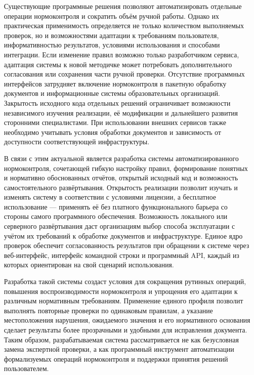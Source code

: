 \documentclass[a4paper,14pt]{extarticle}
\begin{document}
Существующие программные решения позволяют автоматизировать отдельные операции нормоконтроля и сократить объём ручной работы. Однако их практическая применимость определяется не только количеством выполняемых проверок, но и возможностями адаптации к требованиям пользователя, информативностью результатов, условиями использования и способами интеграции. Если изменение правил возможно только разработчиком сервиса, адаптация системы к новой методичке может потребовать дополнительного согласования или сохранения части ручной проверки. Отсутствие программных интерфейсов затрудняет включение нормоконтроля в пакетную обработку документов и информационные системы образовательных организаций. Закрытость исходного кода отдельных решений ограничивает возможности независимого изучения реализации, её модификации и дальнейшего развития сторонними специалистами. При использовании внешних сервисов также необходимо учитывать условия обработки документов и зависимость от доступности соответствующей инфраструктуры.

В связи с этим актуальной является разработка системы автоматизированного нормоконтроля, сочетающей гибкую настройку правил, формирование понятных и нормативно обоснованных отчётов, открытый исходный код и возможность самостоятельного развёртывания. Открытость реализации позволит изучать и изменять систему в соответствии с условиями лицензии, а бесплатное использование — применять её без платного функционального барьера со стороны самого программного обеспечения. Возможность локального или серверного развёртывания даст организациям выбор способа эксплуатации с учётом их требований к обработке документов и инфраструктуре. Единое ядро проверок обеспечит согласованность результатов при обращении к системе через веб-интерфейс, интерфейс командной строки и программный API, каждый из которых ориентирован на свой сценарий использования.

Разработка такой системы создаст условия для сокращения рутинных операций, повышения воспроизводимости нормоконтроля и упрощения его адаптации к различным нормативным требованиям. Применение единого профиля позволит выполнять повторные проверки по одинаковым правилам, а указание местоположения нарушения, ожидаемого значения и его нормативного основания сделает результаты более прозрачными и удобными для исправления документа. Таким образом, разрабатываемая система рассматривается не как безусловная замена экспертной проверки, а как программный инструмент автоматизации формализуемых операций нормоконтроля и поддержки принятия решений пользователем.
\end{document}
